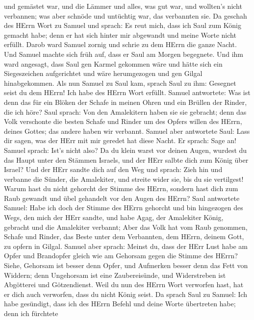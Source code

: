 und gemästet war, und die Lämmer und alles, was gut war, und wollten's
nicht verbannen; was aber schnöde und untüchtig war, das verbannten sie.
 Da geschah des HErrn Wort zu Samuel und sprach:
 Es reut mich, dass ich Saul zum König gemacht habe; denn
er hat sich hinter mir abgewandt und meine Worte nicht erfüllt. Darob
ward Samuel zornig und schrie zu dem HErrn die ganze Nacht.
 Und Samuel machte sich früh auf, dass er Saul am Morgen
begegnete. Und ihm ward angesagt, dass Saul gen Karmel gekommen wäre und
hätte sich ein Siegeszeichen aufgerichtet und wäre herumgezogen und gen
Gilgal hinabgekommen.  Als nun Samuel zu Saul kam, sprach
Saul zu ihm: Gesegnet seist du dem HErrn! Ich habe des HErrn Wort
erfüllt.  Samuel antwortete: Was ist denn das für ein
Blöken der Schafe in meinen Ohren und ein Brüllen der Rinder, die ich
höre?  Saul sprach: Von den Amalekitern haben sie sie
gebracht; denn das Volk verschonte die besten Schafe und Rinder um des
Opfers willen des HErrn, deines Gottes; das andere haben wir verbannt.
 Samuel aber antwortete Saul: Lass dir sagen, was der HErr
mit mir geredet hat diese Nacht. Er sprach: Sage an! 
Samuel sprach: Ist's nicht also? Da du klein warst vor deinen Augen,
wurdest du das Haupt unter den Stämmen Israels, und der HErr salbte dich
zum König über Israel?  Und der HErr sandte dich auf den
Weg und sprach: Zieh hin und verbanne die Sünder, die Amalekiter, und
streite wider sie, bis du sie vertilgest!  Warum hast du
nicht gehorcht der Stimme des HErrn, sondern hast dich zum Raub gewandt
und übel gehandelt vor den Augen des HErrn?  Saul
antwortete Samuel: Habe ich doch der Stimme des HErrn gehorcht und bin
hingezogen des Wegs, den mich der HErr sandte, und habe Agag, der
Amalekiter König, gebracht und die Amalekiter verbannt; 
Aber das Volk hat vom Raub genommen, Schafe und Rinder, das Beste unter
dem Verbannten, dem HErrn, deinem Gott, zu opfern in Gilgal.
 Samuel aber sprach: Meinst du, dass der HErr Lust habe am
Opfer und Brandopfer gleich wie am Gehorsam gegen die Stimme des HErrn?
Siehe, Gehorsam ist besser denn Opfer, und Aufmerken besser denn das
Fett von Widdern;  denn Ungehorsam ist eine Zaubereisünde,
und Widerstreben ist Abgötterei und Götzendienst. Weil du nun des HErrn
Wort verworfen hast, hat er dich auch verworfen, dass du nicht König
seist.  Da sprach Saul zu Samuel: Ich habe gesündigt, dass
ich des HErrn Befehl und deine Worte übertreten habe; denn ich fürchtete
